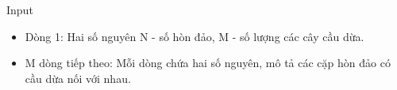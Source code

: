 Input
\begin{itemize}
	\item     Dòng 1: Hai số nguyên N - số hòn đảo, M - số lượng các cây cầu dừa.   
	\item     M dòng tiếp theo: Mỗi dòng chứa hai số nguyên, mô tả các cặp hòn đảo có cầu dừa nối với nhau.   
\end{itemize}